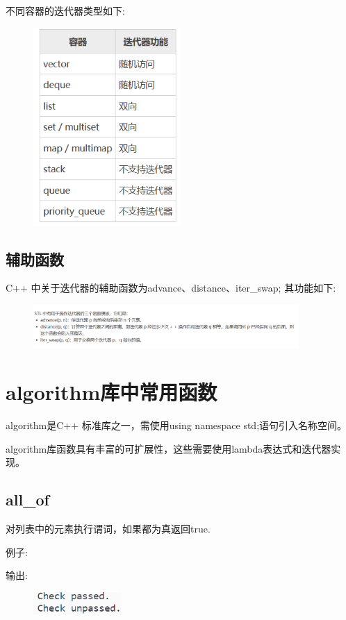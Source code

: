 \documentclass{article}
\begin{document}
    不同容器的迭代器类型如下:
    \begin{figure}[H]
        \centering
        \includegraphics[width = 0.5\textwidth]{fig6.png}
    \end{figure}

    \subsection{辅助函数}
    C++ 中关于迭代器的辅助函数为advance、distance、iter\_swap;
    其功能如下:
    \begin{figure}[H]
        \centering
        \includegraphics[width = 0.9\textwidth]{fig7.png}
    \end{figure}

    \section{algorithm库中常用函数}
    algorithm是C++ 标准库之一，需使用using namespace std;语句引入名称空间。
    
    algorithm库函数具有丰富的可扩展性，这些需要使用lambda表达式和迭代器实现。


    \subsection{all\_of}
    对列表中的元素执行谓词，如果都为真返回true.
    
    例子:
    
    输出:
    \begin{figure}[H]
        \centering
        \includegraphics[width = 0.3\textwidth]{fig8.png}
    \end{figure}
\end{document}
